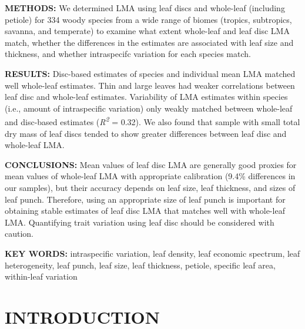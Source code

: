 \documentclass[
  12pt,
  a4paper,
,tablecaptionabove
]{scrartcl}
\begin{document}
\textbf{METHODS:} We determined LMA using leaf discs and whole-leaf
(including petiole) for 334 woody species from a wide range of biomes
(tropics, subtropics, savanna, and temperate) to examine what extent
whole-leaf and leaf disc LMA match, whether the differences in the
estimates are associated with leaf size and thickness, and whether
intraspecifc variation for each species match.

\textbf{RESULTS:} Disc-based estimates of species and individual mean
LMA matched well whole-leaf estimates. Thin and large leaves had weaker
correlations between leaf disc and whole-leaf estimates. Variability of
LMA estimates within species (i.e., amount of intraspecific variation)
only weakly matched between whole-leaf and disc-based estimates
(\emph{R\textsuperscript{2}} = 0.32). We also found that sample with
small total dry mass of leaf discs tended to show greater differences
between leaf disc and whole-leaf LMA.

\textbf{CONCLUSIONS:} Mean values of leaf disc LMA are generally good
proxies for mean values of whole-leaf LMA with appropriate calibration
(9.4\% differences in our samples), but their accuracy depends on leaf
size, leaf thickness, and sizes of leaf punch. Therefore, using an
appropriate size of leaf punch is important for obtaining stable
estimates of leaf disc LMA that matches well with whole-leaf LMA.
Quantifying trait variation using leaf disc should be considered with
caution.

\textbf{KEY WORDS:} intraspecific variation, leaf density, leaf economic
spectrum, leaf heterogeneity, leaf punch, leaf size, leaf thickness,
petiole, specific leaf area, within-leaf variation

\hypertarget{introduction}{%
\section{INTRODUCTION}\label{introduction}}
\end{document}
